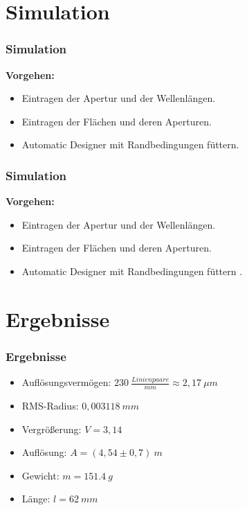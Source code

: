 \documentclass{beamer}
\begin{document}
\section{Simulation}

\begin{frame}\frametitle{Simulation}
	\textbf{Vorgehen:}
	\begin{itemize}
		\item Eintragen der Apertur und der Wellenlängen. \pause
		\item Eintragen der Flächen und deren Aperturen. \pause
		\item Automatic Designer mit Randbedingungen \glqq füttern\grqq. \pause 
	\end{itemize}

\end{frame}

\begin{frame}\frametitle{Simulation}
\textbf{Vorgehen:}
	\begin{itemize}
		\item Eintragen der Apertur und der Wellenlängen. 
		\item Eintragen der Flächen und deren Aperturen. 
		\item Automatic Designer mit Randbedingungen \glqq füttern \grqq. 
	\end{itemize}

\end{frame}




\section{Ergebnisse}
\begin{frame}
	\frametitle{Ergebnisse}

 \begin{itemize}
 	\item Auflösungsvermögen: $230 ~\frac{Linienpaare}{mm}  \approx 2,17~\mu m$\pause
 	\item RMS-Radius:  $0,003118~mm$ \pause
 	\item Vergrößerung: $V=3,14 $  \pause
 	\item Auflösung: $A=(4,54\pm0,7)~m$\pause
 	\item Gewicht: $m = 151.4~g$ \pause
 	\item Länge: $l =  62 ~mm$
 	 
 \end{itemize}
\end{frame}
\end{document}
